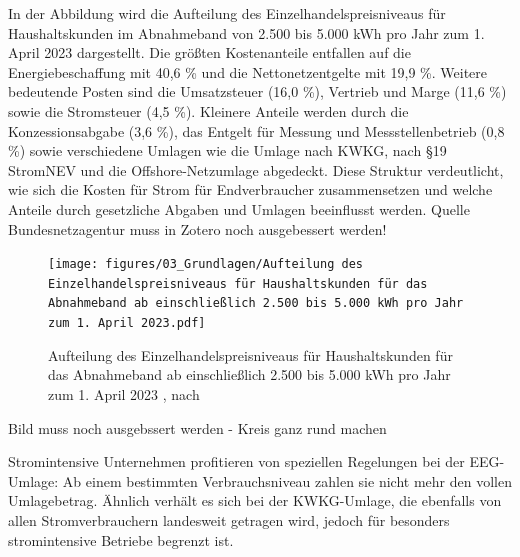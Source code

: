 In der Abbildung  wird die Aufteilung des Einzelhandelspreisniveaus für Haushaltskunden im Abnahmeband von 2.500 bis 5.000 kWh pro Jahr zum 1. April 2023 dargestellt. Die größten Kostenanteile entfallen auf die Energiebeschaffung mit 40,6 \% und die Nettonetzentgelte mit 19,9 \%. Weitere bedeutende Posten sind die Umsatzsteuer (16,0 \%), Vertrieb und Marge (11,6 \%) sowie die Stromsteuer (4,5 \%). Kleinere Anteile werden durch die Konzessionsabgabe (3,6 \%), das Entgelt für Messung und Messstellenbetrieb (0,8 \%) sowie verschiedene Umlagen wie die Umlage nach KWKG, nach §19 StromNEV und die Offshore-Netzumlage abgedeckt. Diese Struktur verdeutlicht, wie sich die Kosten für Strom für Endverbraucher zusammensetzen und welche Anteile durch gesetzliche Abgaben und Umlagen beeinflusst werden.
Quelle Bundesnetzagentur muss in Zotero noch ausgebessert werden!
\begin{figure}[h]
	\centering
	\texttt{[image: figures/03\_Grundlagen/Aufteilung des Einzelhandelspreisniveaus für Haushaltskunden für das Abnahmeband ab einschließlich 2.500 bis 5.000 kWh pro Jahr zum 1. April 2023.pdf]}
	\caption{Aufteilung des Einzelhandelspreisniveaus für Haushaltskunden für das Abnahmeband ab einschließlich 2.500 bis 5.000 kWh pro Jahr zum 1. April 2023 , nach \cite{BundesnetzagenturMonitoringberichte}}
	\label{fig_03Aufteilung des Einzelhandelspreisniveaus für Haushaltskunden für das Abnahmeband ab einschließlich 2.500 bis 5.000 kWh pro Jahr zum 1. April 2023}
\end{figure}
Bild muss noch ausgebssert werden - Kreis ganz rund machen

Stromintensive Unternehmen profitieren von speziellen Regelungen bei der EEG-Umlage: Ab einem bestimmten Verbrauchsniveau zahlen sie nicht mehr den vollen Umlagebetrag. Ähnlich verhält es sich bei der KWKG-Umlage, die ebenfalls von allen Stromverbrauchern landesweit getragen wird, jedoch für besonders stromintensive Betriebe begrenzt ist.


